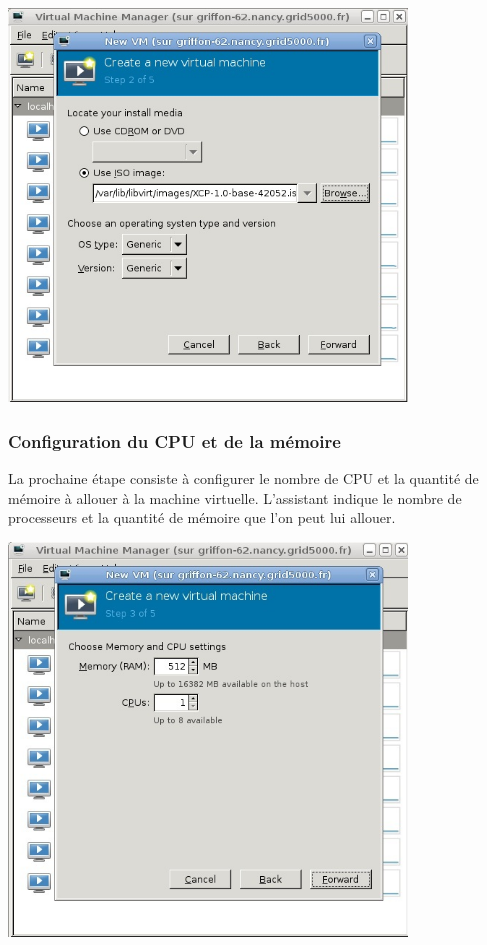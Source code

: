 \begin{center}
\includegraphics[width=300pt]{images/iso.jpg}
\end{center}

\subsubsection{Configuration du CPU et de la mémoire}
La prochaine étape consiste à configurer le nombre de CPU et la quantité de mémoire à allouer à la machine virtuelle. L'assistant indique le nombre de processeurs et la quantité de mémoire que l'on peut lui allouer.
\begin{center}
\includegraphics[width=300pt]{images/cpu.jpg}
\end{center}

